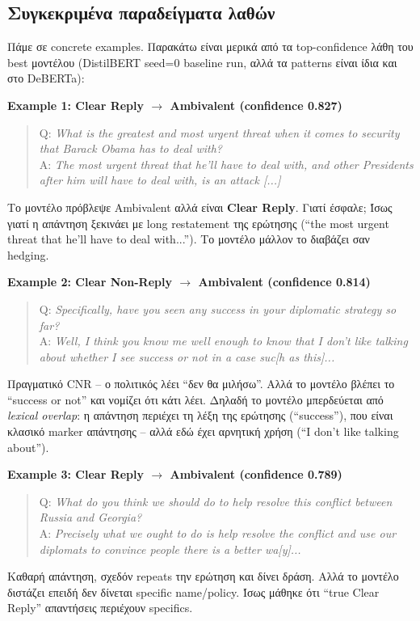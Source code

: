 \documentclass[12pt]{fphw}
\begin{document}
\subsection{Συγκεκριμένα παραδείγματα λαθών}

Πάμε σε concrete examples. Παρακάτω είναι μερικά από τα top-confidence λάθη του best μοντέλου (DistilBERT seed=0 baseline run, αλλά τα patterns είναι ίδια και στο DeBERTa):

\textbf{Example 1: Clear Reply $\rightarrow$ Ambivalent (confidence 0.827)}
\begin{quote}
Q: \emph{What is the greatest and most urgent threat when it comes to security that Barack Obama has to deal with?} \\
A: \emph{The most urgent threat that he'll have to deal with, and other Presidents after him will have to deal with, is an attack [...]}
\end{quote}
Το μοντέλο πρόβλεψε Ambivalent αλλά είναι \textbf{Clear Reply}. Γιατί έσφαλε; Ίσως γιατί η απάντηση ξεκινάει με long restatement της ερώτησης (``the most urgent threat that he'll have to deal with...''). Το μοντέλο μάλλον το διαβάζει σαν hedging.

\textbf{Example 2: Clear Non-Reply $\rightarrow$ Ambivalent (confidence 0.814)}
\begin{quote}
Q: \emph{Specifically, have you seen any success in your diplomatic strategy so far?} \\
A: \emph{Well, I think you know me well enough to know that I don't like talking about whether I see success or not in a case suc[h as this]...}
\end{quote}
Πραγματικό CNR -- ο πολιτικός λέει ``δεν θα μιλήσω''. Αλλά το μοντέλο βλέπει το ``success or not'' και νομίζει ότι κάτι λέει. Δηλαδή το μοντέλο μπερδεύεται από \emph{lexical overlap}: η απάντηση περιέχει τη λέξη της ερώτησης (``success''), που είναι κλασικό marker απάντησης -- αλλά εδώ έχει αρνητική χρήση (``I don't like talking about'').

\textbf{Example 3: Clear Reply $\rightarrow$ Ambivalent (confidence 0.789)}
\begin{quote}
Q: \emph{What do you think we should do to help resolve this conflict between Russia and Georgia?} \\
A: \emph{Precisely what we ought to do is help resolve the conflict and use our diplomats to convince people there is a better wa[y]...}
\end{quote}
Καθαρή απάντηση, σχεδόν repeats την ερώτηση και δίνει δράση. Αλλά το μοντέλο διστάζει επειδή δεν δίνεται specific name/policy. Ίσως μάθηκε ότι ``true Clear Reply'' απαντήσεις περιέχουν specifics.
\end{document}
